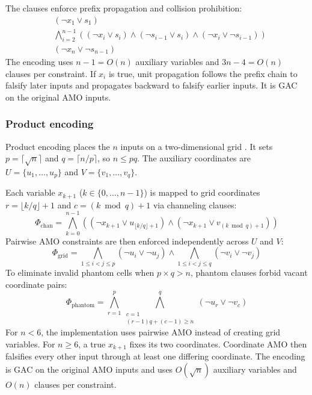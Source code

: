 \documentclass[a4paper,fleqn]{cas-sc}
\begin{document}
The clauses enforce prefix propagation and collision prohibition:
\begin{align}
& (\neg x_1 \vee s_1) \\
& \bigwedge_{i=2}^{n-1} \left( (\neg x_i \vee s_i) \wedge (\neg s_{i-1} \vee s_i) \wedge (\neg x_i \vee \neg s_{i-1}) \right) \\
& (\neg x_n \vee \neg s_{n-1})
\end{align}
The encoding uses $n-1=O(n)$ auxiliary variables and $3n-4=O(n)$ clauses per constraint. If $x_i$ is true, unit propagation follows the prefix chain to falsify later inputs and propagates backward to falsify earlier inputs. It is GAC on the original AMO inputs.

\subsubsection{Product encoding}
Product encoding places the $n$ inputs on a two-dimensional grid \cite{chen2010new}. It sets $p=\lceil\sqrt{n}\rceil$ and $q=\lceil n/p\rceil$, so $n\leq pq$. The auxiliary coordinates are $U=\{u_1,\dots,u_p\}$ and $V=\{v_1,\dots,v_q\}$.

Each variable $x_{k+1}$ ($k \in \{0, \dots, n-1\}$) is mapped to grid coordinates $r = \lfloor k/q \rfloor + 1$ and $c = (k \bmod q) + 1$ via channeling clauses:
\begin{equation}
\Phi_{\text{chan}} = \bigwedge_{k=0}^{n-1} \left( (\neg x_{k+1} \vee u_{\lfloor k/q \rfloor + 1}) \wedge (\neg x_{k+1} \vee v_{(k \bmod q) + 1}) \right)
\end{equation}
Pairwise AMO constraints are then enforced independently across $U$ and $V$:
\begin{equation}
\Phi_{\text{grid}} = \bigwedge_{1 \leq i < j \leq p} (\neg u_i \vee \neg u_j) \wedge \bigwedge_{1 \leq i < j \leq q} (\neg v_i \vee \neg v_j)
\end{equation}
To eliminate invalid phantom cells when $p \times q > n$, phantom clauses forbid vacant coordinate pairs:
\begin{equation}
\Phi_{\text{phantom}} = \bigwedge_{r=1}^{p} \bigwedge_{\substack{c=1 \\ (r-1)q + (c-1) \geq n}}^{q} (\neg u_r \vee \neg v_c)
\end{equation}
For $n<6$, the implementation uses pairwise AMO instead of creating grid variables. For $n\geq6$, a true $x_{k+1}$ fixes its two coordinates. Coordinate AMO then falsifies every other input through at least one differing coordinate. The encoding is GAC on the original AMO inputs and uses $O(\sqrt{n})$ auxiliary variables and $O(n)$ clauses per constraint.
\end{document}
